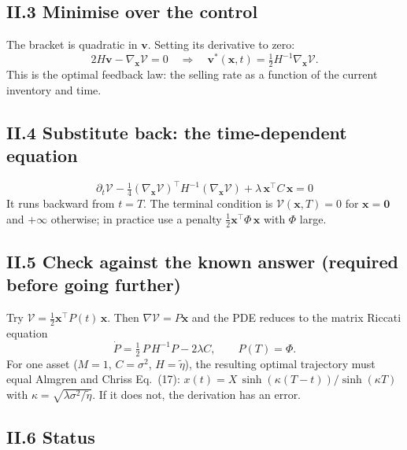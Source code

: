 \documentclass[11pt,a4paper]{article}
\begin{document}
\subsection*{II.3 Minimise over the control}

The bracket is quadratic in $\mathbf{v}$. Setting its derivative to zero:
\begin{equation}
  2H\mathbf{v}-\nabla_{\mathbf{x}}\mathcal{V}=0
  \quad\Longrightarrow\quad
  \mathbf{v}^*(\mathbf{x},t)=\tfrac12H^{-1}\nabla_{\mathbf{x}}\mathcal{V}.
\end{equation}
This is the optimal feedback law: the selling rate as a function of the current
inventory and time.

\subsection*{II.4 Substitute back: the time-dependent equation}

\begin{equation}
  \boxed{\;\partial_t\mathcal{V}-\tfrac14(\nabla_{\mathbf{x}}\mathcal{V})^\top H^{-1}
  (\nabla_{\mathbf{x}}\mathcal{V})+\lambda\,\mathbf{x}^\top C\,\mathbf{x}=0\;}
\end{equation}
It runs backward from $t=T$. The terminal condition is $\mathcal{V}(\mathbf{x},T)=0$
for $\mathbf{x}=\mathbf{0}$ and $+\infty$ otherwise; in practice use a penalty
$\tfrac12\mathbf{x}^\top\Phi\,\mathbf{x}$ with $\Phi$ large.

\subsection*{II.5 Check against the known answer (required before going further)}

Try $\mathcal{V}=\tfrac12\mathbf{x}^\top P(t)\,\mathbf{x}$. Then
$\nabla\mathcal{V}=P\mathbf{x}$ and the PDE reduces to the matrix Riccati equation
\begin{equation}
  \dot P=\tfrac12\,P\,H^{-1}P-2\lambda C,\qquad P(T)=\Phi .
\end{equation}
For one asset ($M=1$, $C=\sigma^2$, $H=\tilde\eta$), the resulting optimal
trajectory must equal Almgren and Chriss Eq.~(17):
$x(t)=X\,\sinh(\kappa(T-t))/\sinh(\kappa T)$ with $\kappa=\sqrt{\lambda\sigma^2/\tilde\eta}$.
If it does not, the derivation has an error.

\subsection*{II.6 Status}
\end{document}
